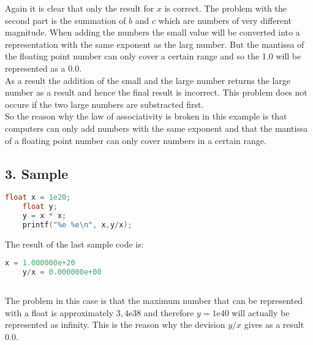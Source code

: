 Again it is clear that only the result for $x$ is correct.
The problem with the second part is the summation of $b$
and $c$ which are numbers of very different magnitude.
When adding the numbers the small value will be converted
into a representation with the same exponent as the 
larg number. But the mantissa of the floating point number
can only cover a certain range and so the 1.0 will be represented
as a 0.0. \\
As a result the addition of the small and the large number 
returns the large number as a result and hence the final 
result is incorrect.
This problem does not occure if the two large numbers are 
substracted first.\\
So the reason why the law of associativity is broken in this
example is that computers can only add numbers with the same
exponent and that the mantissa of a floating point number
can only cover numbers in a certain range.\\


\subsection*{3. Sample}

\begin{lstlisting}[language=C++]
    float x = 1e20;
    float y;
    y = x * x;
    printf("%e %e\n", x,y/x);

\end{lstlisting}

The result of the last sample code is:
\begin{lstlisting}[language=C++]
    x = 1.000000e+20 
    y/x = 0.000000e+00
    
\end{lstlisting}

The problem in this case is that the maximum number that
can be represented with a float is approximately $3,4\textrm{e}38$
and therefore $y=1\textrm{e}40$ will actually be represented as infinity.
This is the reason why the devision $y/x$ gives as a result 0.0.\\